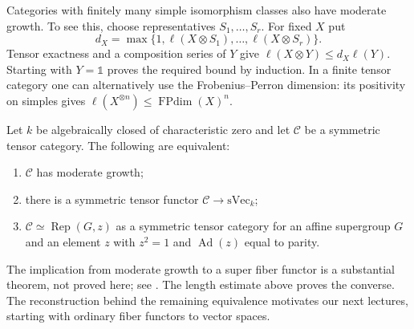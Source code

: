 Categories with finitely many simple isomorphism classes also have moderate growth. To see this, choose representatives $S_1,\ldots,S_r$. For fixed $X$ put
\[
 d_X=\max\{1,\ell(X\otimes S_1),\ldots,\ell(X\otimes S_r)\}.
\]
Tensor exactness and a composition series of $Y$ give $\ell(X\otimes Y)\leq d_X\ell(Y)$. Starting with $Y=\mathbb{1}$ proves the required bound by induction. In a finite tensor category one can alternatively use the Frobenius--Perron dimension: its positivity on simples gives $\ell(X^{\otimes n})\leq\operatorname{FPdim}(X)^n$.

\begin{theorem}[Deligne]\label{thm:deligne-moderate}
Let $k$ be algebraically closed of characteristic zero and let $\mathcal C$ be a symmetric tensor category. The following are equivalent:
\begin{enumerate}
\item $\mathcal C$ has moderate growth;
\item there is a symmetric tensor functor $\mathcal C\to\mathrm{sVec}_k$;
\item $\mathcal C\simeq\operatorname{Rep}(G,z)$ as a symmetric tensor category for an affine supergroup $G$ and an element $z$ with $z^2=1$ and $\operatorname{Ad}(z)$ equal to parity.
\end{enumerate}
\end{theorem}
The implication from moderate growth to a super fiber functor is a substantial theorem, not proved here; see \cite[Theorems 9.11.4 and 9.11.9]{EGNO}. The length estimate above proves the converse. The reconstruction behind the remaining equivalence motivates our next lectures, starting with ordinary fiber functors to vector spaces.
